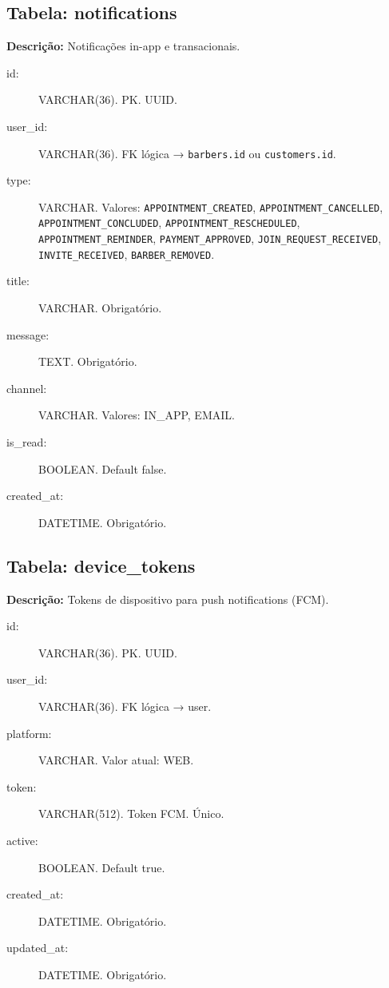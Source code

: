 \documentclass[
    12pt, 
    a4paper, 
    oneside, 
    chapter=TITLE, 
    section=TITLE
]{abntex2}
\begin{document}
\begin{apendicesenv}
\subsection*{Tabela: notifications}
\textbf{Descrição:} Notificações in-app e transacionais.
\begin{description}
    \item[id:] VARCHAR(36). PK. UUID.
    \item[user\_id:] VARCHAR(36). FK lógica → \texttt{barbers.id} ou \texttt{customers.id}.
    \item[type:] VARCHAR. Valores: \texttt{APPOINTMENT\_CREATED}, \texttt{APPOINTMENT\_CANCELLED}, \texttt{APPOINTMENT\_CONCLUDED}, \texttt{APPOINTMENT\_RESCHEDULED}, \texttt{APPOINTMENT\_REMINDER}, \texttt{PAYMENT\_APPROVED}, \texttt{JOIN\_REQUEST\_RECEIVED}, \texttt{INVITE\_RECEIVED}, \texttt{BARBER\_REMOVED}.
    \item[title:] VARCHAR. Obrigatório.
    \item[message:] TEXT. Obrigatório.
    \item[channel:] VARCHAR. Valores: IN\_APP, EMAIL.
    \item[is\_read:] BOOLEAN. Default false.
    \item[created\_at:] DATETIME. Obrigatório.
\end{description}

\subsection*{Tabela: device\_tokens}
\textbf{Descrição:} Tokens de dispositivo para push notifications (FCM).
\begin{description}
    \item[id:] VARCHAR(36). PK. UUID.
    \item[user\_id:] VARCHAR(36). FK lógica → user.
    \item[platform:] VARCHAR. Valor atual: WEB.
    \item[token:] VARCHAR(512). Token FCM. Único.
    \item[active:] BOOLEAN. Default true.
    \item[created\_at:] DATETIME. Obrigatório.
    \item[updated\_at:] DATETIME. Obrigatório.
\end{description}

\end{apendicesenv}

\end{document}
